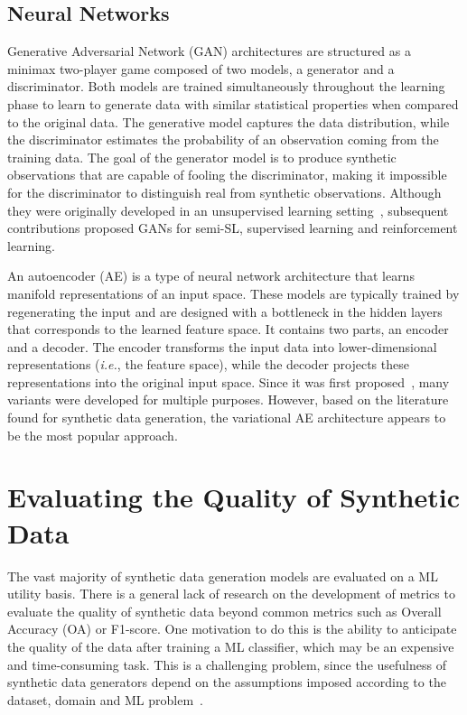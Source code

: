 \documentclass[parskip=full]{scrartcl}
\begin{document}
\subsection{Neural Networks}

Generative Adversarial Network (GAN) architectures are structured as a minimax
two-player game composed of two models, a generator and a discriminator. Both
models are trained simultaneously throughout the learning phase to learn to
generate data with similar statistical properties when compared to the
original data. The generative model captures the data distribution, while the
discriminator estimates the probability of an observation coming from the
training data. The goal of the generator model is to produce synthetic
observations that are capable of fooling the discriminator, making it
impossible for the discriminator to distinguish real from synthetic
observations.  Although they were originally developed in an unsupervised
learning setting~\cite{goodfellow2020generative}, subsequent contributions
proposed GANs for semi-SL, supervised learning and reinforcement learning.

An autoencoder (AE) is a type of neural network architecture that learns
manifold representations of an input space. These models are typically trained
by regenerating the input and are designed with a bottleneck in the hidden
layers that corresponds to the learned feature space. It contains two parts,
an encoder and a decoder. The encoder transforms the input data into
lower-dimensional representations (\textit{i.e.}, the feature space), while
the decoder projects these representations into the original input space.
Since it was first proposed~\cite{ackley1985learning}, many variants were
developed for multiple purposes. However, based on the literature found for
synthetic data generation, the variational AE architecture appears to be the
most popular approach.

\section{Evaluating the Quality of Synthetic Data
}\label{sec:evaluating-synthetic-data}

The vast majority of synthetic data generation models are evaluated on a ML
utility basis. There is a general lack of research on the development of
metrics to evaluate the quality of synthetic data beyond common metrics such
as Overall Accuracy (OA) or F1-score. One motivation to do this is the ability
to anticipate the quality of the data after training a ML classifier, which
may be an expensive and time-consuming task. This is a challenging problem,
since the usefulness of synthetic data generators depend on the assumptions
imposed according to the dataset, domain and ML
problem~\cite{chundawat2022tabsyndex}.
\end{document}
